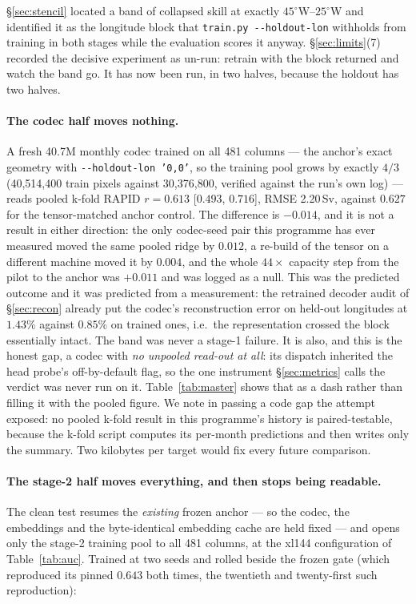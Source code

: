 \documentclass[10pt]{article}
\begin{document}
\S\ref{sec:stencil} located a band of collapsed skill at exactly
$45^\circ$W--$25^\circ$W and identified it as the longitude block that
\texttt{train.py -{}-holdout-lon} withholds from training in both stages
while the evaluation scores it anyway. \S\ref{sec:limits}(7) recorded the
decisive experiment as un-run: retrain with the block returned and watch the
band go. It has now been run, in two halves, because the holdout has two
halves.

\paragraph{The codec half moves nothing.} A fresh 40.7M monthly codec
trained on all 481 columns --- the anchor's exact geometry with
\texttt{-{}-holdout-lon '0,0'}, so the training pool grows by exactly $4/3$
(40{,}514{,}400 train pixels against 30{,}376{,}800, verified against the
run's own log) --- reads pooled k-fold RAPID $r=0.613$ [$0.493$, $0.716$],
RMSE 2.20\,Sv, against $0.627$ for the tensor-matched anchor control. The
difference is $-0.014$, and it is not a result in either direction: the only
codec-seed pair this programme has ever measured moved the same pooled ridge
by $0.012$, a re-build of the tensor on a different machine moved it by
$0.004$, and the whole $44\times$ capacity step from the pilot to the anchor
was $+0.011$ and was logged as a null. This was the predicted outcome and it
was predicted from a measurement: the retrained decoder audit of
\S\ref{sec:recon} already put the codec's reconstruction error on held-out
longitudes at $1.43\%$ against $0.85\%$ on trained ones, i.e.\ the
representation crossed the block essentially intact. The band was never a
stage-1 failure. It is also, and this is the honest gap, a codec with
\emph{no unpooled read-out at all}: its dispatch inherited the head
probe's off-by-default flag, so the one instrument \S\ref{sec:metrics}
calls the verdict was never run on it. Table~\ref{tab:master} shows that
as a dash rather than filling it with the pooled figure. We note in passing a code gap the attempt exposed: no
pooled k-fold result in this programme's history is paired-testable, because
the k-fold script computes its per-month predictions and then writes only
the summary. Two kilobytes per target would fix every future comparison.

\paragraph{The stage-2 half moves everything, and then stops being
readable.} The clean test resumes the \emph{existing} frozen anchor --- so
the codec, the embeddings and the byte-identical embedding cache are held
fixed --- and opens only the stage-2 training pool to all 481 columns, at
the xl144 configuration of Table~\ref{tab:auc}. Trained at two seeds and
rolled beside the frozen gate (which reproduced its pinned $0.643$ both
times, the twentieth and twenty-first such reproduction):
\end{document}
